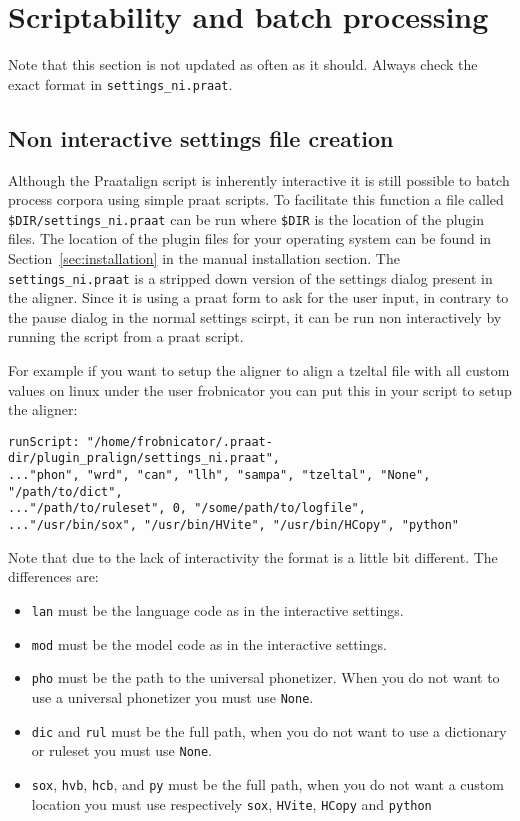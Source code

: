 \section{Scriptability and batch processing}
Note that this section is not updated as often as it should. Always check the
exact format in \texttt{settings\_ni.praat}.

\subsection{Non interactive settings file creation}
Although the Praatalign script is inherently interactive it is still possible
to batch process corpora using simple praat scripts. To facilitate this
function a file called \texttt{\$DIR/settings\_ni.praat} can be run where
\texttt{\$DIR} is the location of the plugin files. The location of the plugin
files for your operating system can be found in Section~\ref{sec:installation}
in the manual installation section. The \texttt{settings\_ni.praat} is a
stripped down version of the settings dialog present in the aligner. Since it
is using a praat form to ask for the user input, in contrary to the pause
dialog in the normal settings scirpt, it can be run non interactively by
running the script from a praat script.

For example if you want to setup the aligner to align a tzeltal file with all
custom values on linux under the user frobnicator you can put this in your
script to setup the aligner:

\begin{lstlisting}
runScript: "/home/frobnicator/.praat-dir/plugin_pralign/settings_ni.praat",
..."phon", "wrd", "can", "llh", "sampa", "tzeltal", "None", "/path/to/dict",
..."/path/to/ruleset", 0, "/some/path/to/logfile",
..."/usr/bin/sox", "/usr/bin/HVite", "/usr/bin/HCopy", "python"
\end{lstlisting}

Note that due to the lack of interactivity the format is a little bit
different. The differences are:
\begin{itemize}
	\item \texttt{lan} must be the language code as in the interactive settings.
	\item \texttt{mod} must be the model code as in the interactive settings.
	\item \texttt{pho} must be the path to the universal phonetizer. When you do
not want to use a universal phonetizer you must use \texttt{None}.
	\item \texttt{dic} and \texttt{rul} must be the full path, when you do not
want to use a dictionary or ruleset you must use \texttt{None}.
	\item \texttt{sox}, \texttt{hvb}, \texttt{hcb}, and \texttt{py} must be the
full path, when you do not want a custom location you must use respectively
\texttt{sox}, \texttt{HVite}, \texttt{HCopy} and \texttt{python}
\end{itemize}

